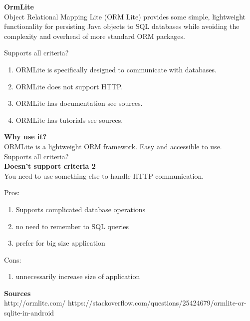 		\textbf{OrmLite} \\
		Object Relational Mapping Lite (ORM Lite) provides some simple, lightweight functionality for persisting Java objects to SQL databases while avoiding the complexity and overhead of more standard ORM packages.

		Supports all criteria? \\
		\begin{enumerate}
			\item ORMLite is specifically designed to communicate with databases.
			\item ORMLite does not support HTTP.
			\item ORMLite has documentation see sources.
			\item ORMLite has tutorials see sources.
		\end{enumerate}

		\textbf{Why use it?} \\
ORMLite is a lightweight ORM framework. Easy and accessible to use.\\


		Supports all criteria?\\
		\textbf{Doesn't support criteria 2}\\
		You need to use something else to handle HTTP communication.
		

		
		Pros:
		\begin{enumerate}
		\item Supports complicated database operations
		\item no need to remember to SQL queries
		\item prefer for big size application
		\end{enumerate}
		Cons:
		\begin{enumerate}
		\item unnecessarily increase size of application
		\end{enumerate}
	
	\textbf{Sources}\\
	http://ormlite.com/
	https://stackoverflow.com/questions/25424679/ormlite-or-sqlite-in-android